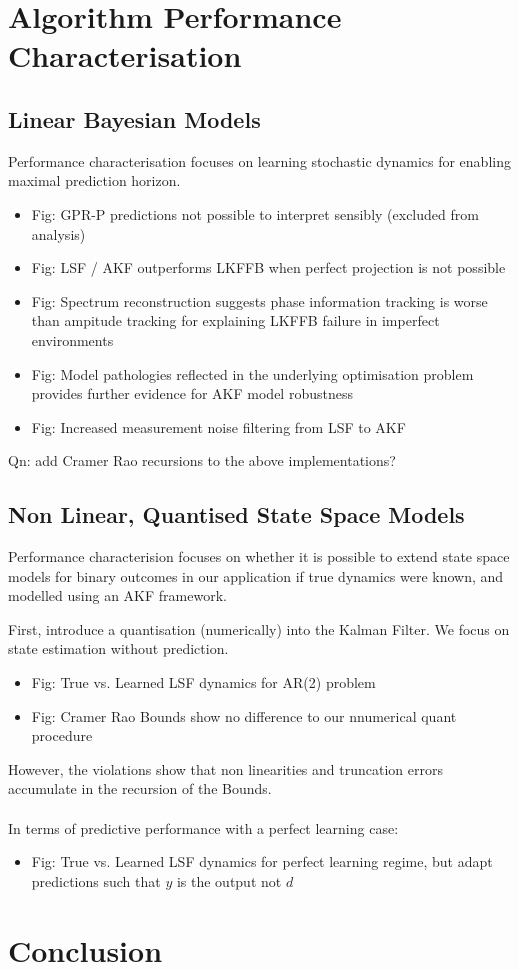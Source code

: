 \section{Algorithm Performance Characterisation}  \label{sec:main:4}

\subsection{Linear Bayesian Models}
Performance characterisation focuses on learning stochastic dynamics for enabling maximal prediction horizon.
\begin{itemize}
\item Fig: GPR-P predictions not possible to interpret sensibly (excluded from analysis)
\item Fig: LSF / AKF outperforms LKFFB when perfect projection is not possible
\item Fig: Spectrum reconstruction suggests phase information tracking is worse than ampitude tracking for explaining LKFFB failure in imperfect environments
\item Fig: Model pathologies reflected in the underlying optimisation problem provides further evidence for AKF model robustness
\item Fig: Increased measurement noise filtering from LSF to AKF
\end{itemize}

Qn: add Cramer Rao recursions to the above implementations?

\subsection{Non Linear, Quantised State Space Models}
Performance characterision focuses on whether it is possible to extend state space models for binary outcomes in our application if true dynamics were known, and modelled using an AKF framework.

First, introduce a quantisation (numerically) into the Kalman Filter. We focus on state estimation without prediction. 
\begin{itemize}
\item Fig: True vs. Learned LSF dynamics for AR(2) problem
\item Fig: Cramer Rao Bounds show no difference to our nnumerical quant procedure
\end{itemize}

However, the violations show that non linearities and truncation errors accumulate in the recursion of the Bounds. 
\\
\\
In terms of predictive performance with a perfect learning case:
\begin{itemize}
\item Fig: True vs. Learned LSF dynamics for perfect learning regime, but adapt predictions such that $y$ is the output not $d$
\end{itemize}
\section{Conclusion}  \label{sec:main:5}

